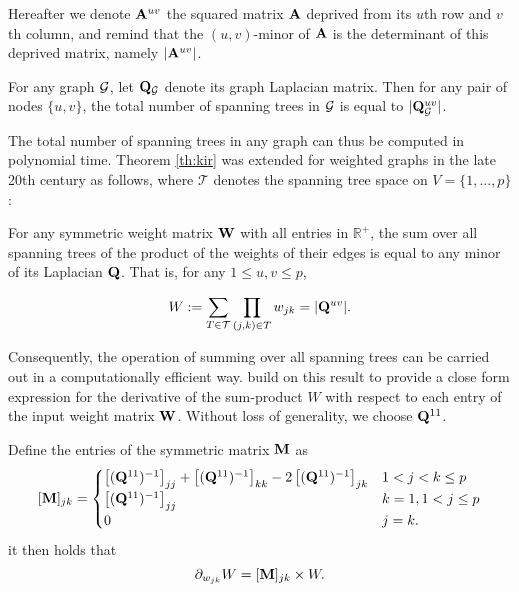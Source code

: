  Hereafter we denote ${\bf A}^{uv}$ the squared matrix ${\bf A}$ deprived from its $u$th row and $v$th column, and remind that the $(u, v)$-minor of ${\bf A}$ is the determinant of this deprived matrix, namely $|{\bf A}^{uv}|$.
 
 \begin{theorem}\label{th:kir}
 For any graph $\mathcal{G}$, let  ${\bf Q}_{\mathcal{G}}$ denote its graph Laplacian matrix. Then for any  pair of nodes $\{u,v\}$, the total number of spanning trees in $\mathcal{G}$ is equal to  $|{\bf Q}_{\mathcal{G}}^{uv}|$.
\end{theorem}  

 
The total number of spanning trees in any graph can thus be computed in polynomial time. Theorem \ref{th:kir} was extended for weighted graphs in the late 20th century as follows, where $\mathcal{T}$ denotes the spanning tree space on $V=\{1,...,p\}$:

\begin{theorem} \label{thmm:MTT}
    For any symmetric weight matrix ${\bf W}$ with all entries in $\mathds{R}^+$, the sum over all spanning trees of the product of the weights of their edges is equal to any minor of its Laplacian ${\bf Q}$. That is, for any $1 \leq u, v \leq p$,
 
   \[
    W := \sum_{T\in\mathcal{T}} \prod_{(j, k)\in T} w_{jk} = |{\bf Q}^{uv}|.
    \]
   
\end{theorem}    

Consequently, the operation of summing over all spanning trees can be carried out in a computationally efficient way. \cite{MeilaJaak}  build on this result to provide a close form expression for the derivative of the sum-product $W$ with respect to each entry of the input weight matrix ${\bf W}$.   Without loss of generality, we choose ${\bf Q}^{11}$.

\begin{lemma}  \label{lemm:Meila}
    Define the entries of the symmetric matrix ${\bf M}$ as
\[    
 [{\bf M}]_{jk} =\begin{cases}
    \left[({\bf Q}^{11})^{-1}\right]_{jj} + \left[({\bf Q}^{11})^{-1}\right]_{kk} -2\left[({\bf Q}^{11})^{-1}\right]_{jk} & 1< j<k \leq p\\
    \left[({\bf Q}^{11})^{-1}\right]_{jj} & k=1, 1< j \leq p  \\
    0 &  j=k .
    \end{cases}
\] 
it then holds that
$$\partial_{w_{jk}} W = [{\bf M}]_{jk}  \times W.$$
\end{lemma}

